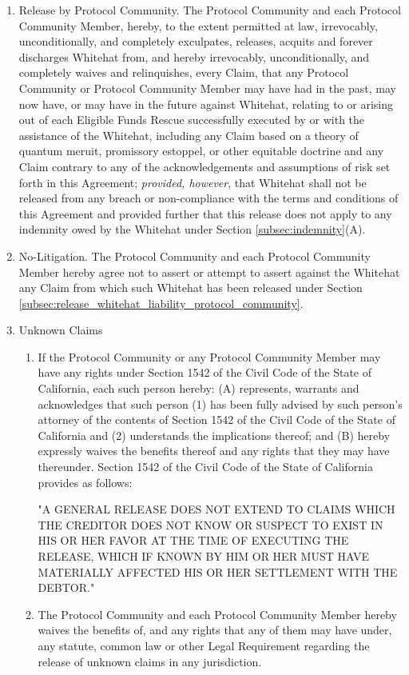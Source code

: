 \documentclass{article}
\begin{document}
\begin{enumerate}[label=\Alph*.]
    \item Release by Protocol Community. The Protocol Community and each Protocol Community Member, hereby, to the extent permitted at law, irrevocably, unconditionally, and completely exculpates, releases, acquits and forever discharges Whitehat from, and hereby irrevocably, unconditionally, and completely waives and relinquishes, every Claim, that any Protocol Community or Protocol Community Member may have had in the past, may now have, or may have in the future against Whitehat, relating to or arising out of each Eligible Funds Rescue successfully executed by or with the assistance of the Whitehat, including any Claim based on a theory of quantum meruit, promissory estoppel, or other equitable doctrine and any Claim contrary to any of the acknowledgements and assumptions of risk set forth in this Agreement; \textit{provided, however}, that Whitehat shall not be released from any breach or non-compliance with the terms and conditions of this Agreement and provided further that this release does not apply to any indemnity owed by the Whitehat under Section \ref{subsec:indemnity}(A).

    \item No-Litigation. The Protocol Community and each Protocol Community Member hereby agree not to assert or attempt to assert against the Whitehat any Claim from which such Whitehat has been released under Section \ref{subsec:release_whitehat_liability_protocol_community}.

    \item Unknown Claims

          \begin{enumerate}

              \item If the Protocol Community or any Protocol Community Member may have any rights under Section 1542 of the Civil Code of the State of California, each such person hereby: (A) represents, warrants and acknowledges that such person (1) has been fully advised by such person's attorney of the contents of Section 1542 of the Civil Code of the State of California and (2) understands the implications thereof; and (B) hereby expressly waives the benefits thereof and any rights that they may have thereunder. Section 1542 of the Civil Code of the State of California provides as follows:

                    "A GENERAL RELEASE DOES NOT EXTEND TO CLAIMS WHICH THE CREDITOR DOES NOT KNOW OR SUSPECT TO EXIST IN HIS OR HER FAVOR AT THE TIME OF EXECUTING THE RELEASE, WHICH IF KNOWN BY HIM OR HER MUST HAVE MATERIALLY AFFECTED HIS OR HER SETTLEMENT WITH THE DEBTOR."

              \item The Protocol Community and each Protocol Community Member hereby waives the benefits of, and any rights that any of them may have under, any statute, common law or other Legal Requirement regarding the release of unknown claims in any jurisdiction.

          \end{enumerate}
\end{enumerate}
\end{document}
